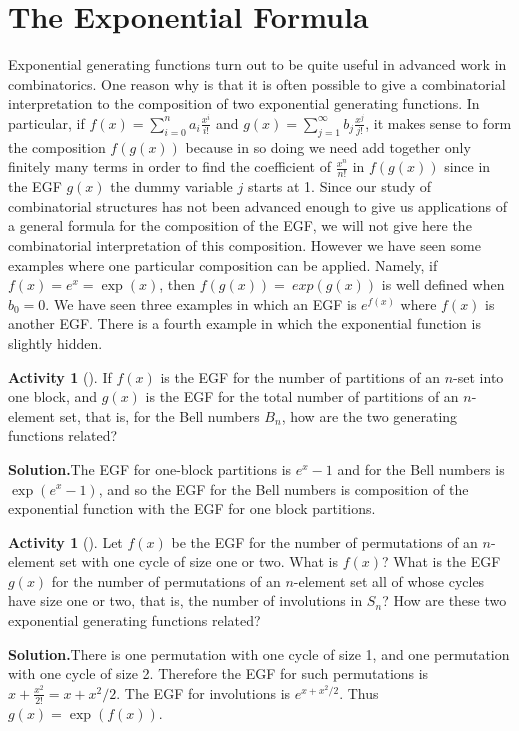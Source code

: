 \documentclass[10pt,]{book}
\theoremstyle{plain}
\theoremstyle{definition}
\newtheorem{activity}[project]{Activity}
\numberwithin{equation}{chapter}
\begin{document}
\section[{The Exponential Formula}]{The Exponential Formula}\label{section-30}
Exponential generating functions turn out to be quite useful in advanced work in combinatorics. One reason why is that it is often possible to give a combinatorial interpretation to the composition of two exponential generating functions. In particular, if \(f(x) =
\sum_{i=0}^n a_i\frac{x^i}{i!}\) and \(g(x) = \sum_{j=1}^\infty b_j \frac{x^j}{j!}\), it makes sense to form the composition \(f(g(x))\) because in so doing we need add together only finitely many terms in order to find the coefficient of \(\frac{x^n}{n!}\) in \(f(g(x))\) since in the EGF \(g(x)\) the dummy variable \(j\) starts at 1. Since our study of combinatorial structures has not been advanced enough to give us applications of a general formula for the composition of the EGF, we will not give here the combinatorial interpretation of this composition. However we have seen some examples where one particular composition can be applied. Namely, if \(f(x) = e^x = \exp(x)\), then \(f(g(x)) =\ exp(g(x))\) is well defined when \(b_0=0\). We have seen three examples in which an EGF is \(e^{f(x)}\) where \(f(x)\) is another EGF. There is a fourth example in which the exponential function is slightly hidden.%
\begin{activity}[]\label{exp_oneblock_}
If \(f(x)\) is the EGF for the number of partitions of an \(n\)-set into one block, and \(g(x)\) is the EGF for the total number of partitions of an \(n\)-element set, that is, for the Bell numbers \(B_n\), how are the two generating functions related?%
\par\medskip\noindent%
\textbf{Solution.}\quad The EGF for one-block partitions is \(e^x-1\) and for the Bell numbers is \(\exp(e^x-1)\), and so the EGF for the Bell numbers is composition of the exponential function with the EGF for one block partitions.%
\end{activity}
\begin{activity}[]\label{exp_oneortwo-cycle_}
Let \(f(x)\) be the EGF for the number of permutations of an \(n\)-element set with one cycle of size one or two. What is \(f(x)\)? What is the EGF \(g(x)\) for the number of permutations of an \(n\)-element set all of whose cycles have size one or two, that is, the number of involutions in \(S_n\)? How are these two exponential generating functions related?%
\par\medskip\noindent%
\textbf{Solution.}\quad There is one permutation with one cycle of size 1, and one permutation with one cycle of size 2. Therefore the EGF for such permutations is \(x+\frac{x^2}{2!}= x+x^2/2\). The EGF for involutions is \(e^{x+x^2/2}\). Thus \(g(x) = \exp(f(x))\).%
\end{activity}
\end{document}
